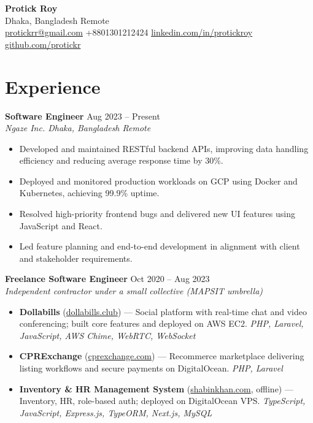 \documentclass[a4paper,10pt]{article}
\begin{document}
{\LARGE \textbf{Protick Roy}}\\[-1pt]
Dhaka, Bangladesh \textbar{} Remote \\[-1pt]
\href{mailto:protickrr@gmail.com}{protickrr@gmail.com} \textbar{} +8801301212424 \textbar{} 
\href{https://www.linkedin.com/in/protickroy}{linkedin.com/in/protickroy} \textbar{} 
\href{https://github.com/protickr}{github.com/protickr}

\vspace{6pt}

\section*{Experience}

\textbf{Software Engineer} \hfill Aug 2023 -- Present\\[-1pt]
\textit{Ngaze Inc. \textbar{} Dhaka, Bangladesh \textbar{} Remote}\\[-3pt]
\begin{itemize}
  \item Developed and maintained RESTful backend APIs, improving data handling efficiency and reducing average response time by 30\%.
  \item Deployed and monitored production workloads on GCP using Docker and Kubernetes, achieving 99.9\% uptime.
  \item Resolved high-priority frontend bugs and delivered new UI features using JavaScript and React.
  \item Led feature planning and end-to-end development in alignment with client and stakeholder requirements.
\end{itemize}

\textbf{Freelance Software Engineer} \hfill Oct 2020 -- Aug 2023\\[-1pt]
\textit{Independent contractor under a small collective (MAPSIT umbrella)}\\[-3pt]
\begin{itemize}
  \item \textbf{Dollabills} (\href{https://dollabills.club}{dollabills.club}) --- Social platform with real-time chat and video conferencing; built core features and deployed on AWS EC2. \emph{PHP, Laravel, JavaScript, AWS Chime, WebRTC, WebSocket}
  \item \textbf{CPRExchange} (\href{https://cprexchange.com}{cprexchange.com}) --- Recommerce marketplace delivering listing workflows and secure payments on DigitalOcean. \emph{PHP, Laravel}
  \item \textbf{Inventory \& HR Management System} (\href{http://shabinkhan.com}{shabinkhan.com}, offline) --- Inventory, HR, role-based auth; deployed on DigitalOcean VPS. \emph{TypeScript, JavaScript, Express.js, TypeORM, Next.js, MySQL}
\end{itemize}
\end{document}
